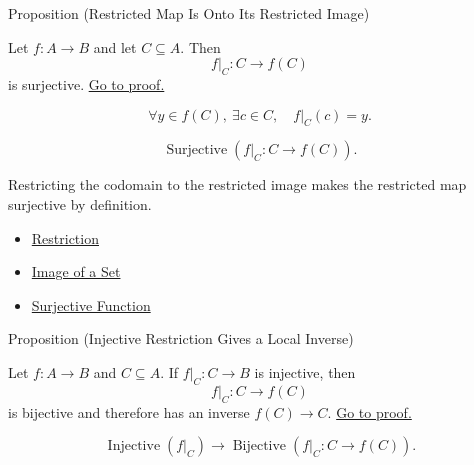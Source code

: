 \begin{propositionbox}{Proposition (Restricted Map Is Onto Its Restricted Image)}
\begin{proposition}\label{prop:restricted-map-onto-image}
Let $f:A\to B$ and let $C\subseteq A$. Then
\[
f|_C:C\to f(C)
\]
is surjective.
\hyperref[prf:restricted-map-onto-image]{Go to proof.}
\end{proposition}
\end{propositionbox}

\begin{remark*}
\[
  \forall y\in f(C),\ \exists c\in C,\quad f|_C(c)=y.
\]
\end{remark*}

\begin{remark*}
\[
  \operatorname{Surjective}(f|_C:C\to f(C)).
\]
\end{remark*}

\begin{remark*}[Interpretation]
Restricting the codomain to the restricted image makes the restricted map
surjective by definition.
\end{remark*}

\begin{dependencies}
\begin{itemize}
  \item \hyperref[def:restriction]{Restriction}
  \item \hyperref[def:image-set]{Image of a Set}
  \item \hyperref[def:surjective]{Surjective Function}
\end{itemize}
\end{dependencies}

\begin{propositionbox}{Proposition (Injective Restriction Gives a Local Inverse)}
\begin{proposition}\label{prop:injective-restriction-local-inverse}
Let $f:A\to B$ and $C\subseteq A$. If $f|_C:C\to B$ is injective, then
\[
f|_C:C\to f(C)
\]
is bijective and therefore has an inverse $f(C)\to C$.
\hyperref[prf:injective-restriction-local-inverse]{Go to proof.}
\end{proposition}
\end{propositionbox}

\begin{remark*}
\[
  \operatorname{Injective}(f|_C)
  \to
  \operatorname{Bijective}(f|_C:C\to f(C)).
\]
\end{remark*}

